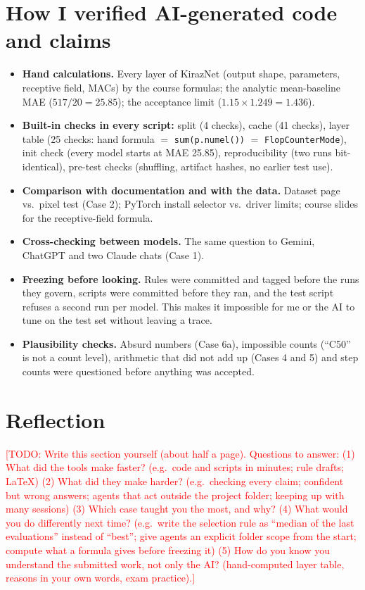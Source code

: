 \documentclass[11pt,a4paper]{article}
\newcommand{\kn}{KirazNet}
\newcommand{\todo}[1]{\textcolor{red}{[TODO: #1]}}
\begin{document}
\section{How I verified AI-generated code and claims}
\begin{itemize}
\item \textbf{Hand calculations.} Every layer of \kn{} (output shape, parameters, receptive field, MACs) by the
course formulas; the analytic mean-baseline MAE ($517/20=25.85$); the acceptance limit ($1.15\times1.249=1.436$).
\item \textbf{Built-in checks in every script:} split (4 checks), cache (41 checks), layer table (25 checks:
hand formula $=$ \texttt{sum(p.numel())} $=$ \texttt{FlopCounterMode}), init check (every model starts at MAE 25.85),
reproducibility (two runs bit-identical), pre-test checks (shuffling, artifact hashes, no earlier test use).
\item \textbf{Comparison with documentation and with the data.} Dataset page vs.\ pixel test (Case 2); PyTorch
install selector vs.\ driver limits; course slides for the receptive-field formula.
\item \textbf{Cross-checking between models.} The same question to Gemini, ChatGPT and two Claude chats (Case 1).
\item \textbf{Freezing before looking.} Rules were committed and tagged before the runs they govern, scripts were
committed before they ran, and the test script refuses a second run per model. This makes it impossible for me
or the AI to tune on the test set without leaving a trace.
\item \textbf{Plausibility checks.} Absurd numbers (Case 6a), impossible counts (``C50'' is not a count level),
arithmetic that did not add up (Cases 4 and 5) and step counts were questioned before anything was accepted.
\end{itemize}

\section{Reflection}
\todo{Write this section yourself (about half a page). Questions to answer:
(1) What did the tools make faster? (e.g.\ code and scripts in minutes; rule drafts; LaTeX)
(2) What did they make harder? (e.g.\ checking every claim; confident but wrong answers; agents that act outside the
project folder; keeping up with many sessions)
(3) Which case taught you the most, and why?
(4) What would you do differently next time? (e.g.\ write the selection rule as ``median of the last
evaluations'' instead of ``best''; give agents an explicit folder scope from the start; compute what a formula
gives before freezing it)
(5) How do you know you understand the submitted work, not only the AI? (hand-computed layer table, reasons in
your own words, exam practice).}
\end{document}
